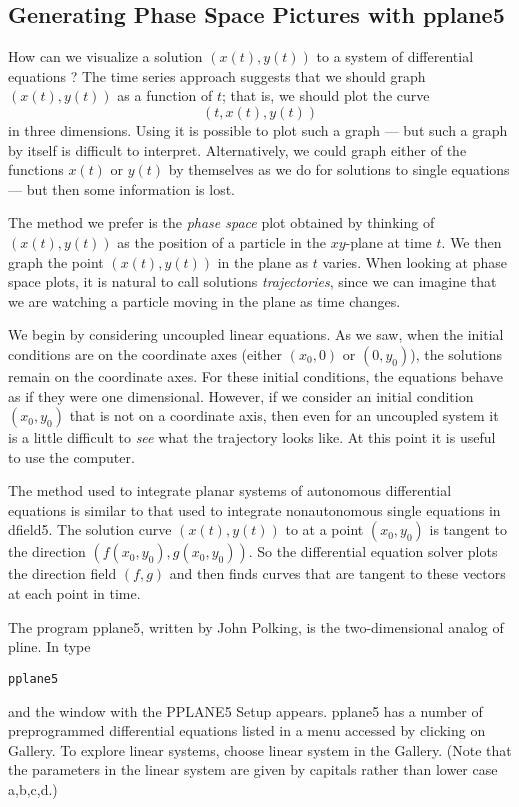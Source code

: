 \documentclass{ximera}
\begin{document}
\subsection*{Generating Phase Space Pictures with {\sf pplane5}}

How can we visualize a solution $(x(t),y(t))$ to a system of
differential equations ?  The time series approach
suggests that we should graph $(x(t),y(t))$ as a function of $t$;
that is, we should plot the curve
\[
(t,x(t),y(t))
\]
in three dimensions.  Using \Matlab it is
possible to plot such a graph --- but such a graph by itself is
difficult to interpret.  Alternatively, we could graph either of
the functions $x(t)$ or $y(t)$ by themselves as we do for
solutions to single equations --- but then some information is
lost.

The method we prefer is the {\em phase space\/} 
plot obtained by thinking of $(x(t),y(t))$ as the
position of a particle in the $xy$-plane at time $t$.  We then
graph the point $(x(t),y(t))$ in the plane as $t$ varies.  When
looking at phase space plots, it is natural to call solutions
{\em trajectories\/}, since we can imagine
that we are watching a particle moving in the plane as time
changes.

We begin by considering uncoupled linear equations.  As we saw,
when the initial conditions are on the coordinate axes (either
$(x_0,0)$ or $(0,y_0)$), the solutions remain on the coordinate
axes.  For these initial conditions, the equations behave as if
they were one dimensional.  However, if we consider an initial
condition $(x_0,y_0)$ that is not on a coordinate axis, then even
for an uncoupled system it is a little difficult to
{\em see\/} what the trajectory looks like.  At this point
it is useful to use the computer.

The method used to integrate planar systems of autonomous
differential equations is similar to that used to integrate
nonautonomous single equations in {\sf dfield5}.  The solution
curve $(x(t),y(t))$ to  at a point $(x_0,y_0)$ is
tangent to the direction $(f(x_0,y_0),g(x_0,y_0))$.  So
the differential equation solver plots the direction field
$(f,g)$ and then finds curves that are tangent to these
vectors at each point in time.

The program {\sf pplane5}, written by John
Polking, is the two-dimensional analog of {\sf pline}.  
In \Matlab type
\begin{verbatim}
pplane5
\end{verbatim}
and the window with the {\sf PPLANE5 Setup} appears. {\sf pplane5}
has a number of preprogrammed differential equations listed in a
menu accessed by clicking on {\sf Gallery}.  To explore linear
systems, choose {\sf linear system} in the {\sf Gallery}.  (Note that the 
parameters in the {\sf linear system} are given by capitals rather than 
lower case {\sf a,b,c,d}.)
\end{document}
